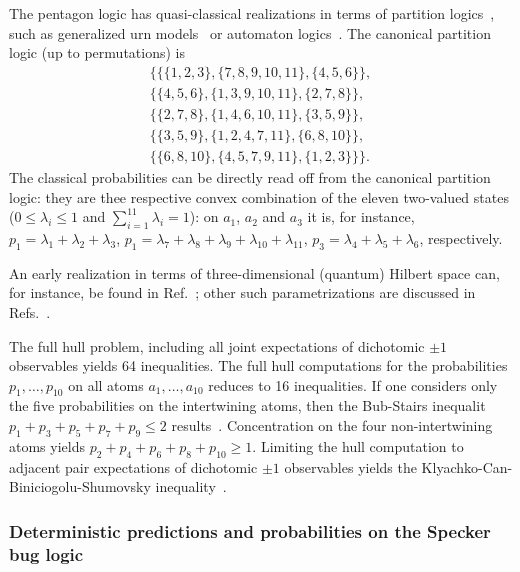 The pentagon logic has quasi-classical realizations in terms of partition logics~\cite{dvur-pul-svo,svozil-2001-eua,svozil-2008-ql},
such as generalized urn models~\cite{wright:pent,wright} or automaton logics~\cite{schaller-92,svozil-93,schaller-95,schaller-96}.
The canonical partition logic (up to permutations)  is
\begin{equation}
\begin{split}
\{
\{
\{1,2,3\},\{7,8,9,10,11\},\{4,5,6\}
\}
,\\
\{
\{4,5,6\},\{1,3,9,10,11\},\{2,7,8\}
\}
,\\
\{
\{2,7,8\},\{1,4,6,10,11\},\{3,5,9\}
\}
,\\
\{
\{3,5,9\},\{1,2,4,7,11\},\{6,8,10\}
\}
,\\
\{
\{6,8,10\},\{4,5,7,9,11\},\{1,2,3\}
\}
\}.
\end{split}
\end{equation}
The classical probabilities can be directly read off from the canonical partition logic: they are thee respective convex combination
of the eleven two-valued states ($0 \le \lambda_i \le 1$ and $\sum_{i=1}^{11}\lambda_i=1$): on $a_1$, $a_2$ and $a_3$ it is, for instance,
$p_1=\lambda_1+\lambda_2+\lambda_3$,
$p_1=\lambda_7+\lambda_8+\lambda_9+\lambda_{10}+\lambda_{11}$,
$p_3= \lambda_4+\lambda_5+\lambda_6$,
respectively.

An early realization in terms of three-dimensional (quantum) Hilbert space can, for instance, be found in Ref.~\cite[pp.~5392,5393]{svozil-tkadlec};
other such parametrizations are discussed in Refs.~\cite{Klyachko-2008,Bub-2009,Bub-2010,Badziag-2011}.

The full hull problem, including all joint expectations of dichotomic $\pm 1$ observables yields 64 inequalities.
The full hull computations for the probabilities $p_1, \ldots , p_{10}$
on all atoms $a_1, \ldots , a_{10}$ reduces to 16 inequalities.
If one considers only the five probabilities on the intertwining atoms,
then the Bub-Stairs inequalit $p_1+p_3+p_5+p_7+p_9 \le 2$ results~\cite{Bub-2009,Bub-2010,Badziag-2011}.
Concentration on the four non-intertwining atoms yields $p_2+p_4+p_6+p_8+p_{10} \ge 1$.
Limiting the hull computation to adjacent pair expectations of dichotomic $\pm 1$ observables
yields the Klyachko-Can-Biniciogolu-Shumovsky inequality~\cite{Klyachko-2008}.


\subsubsection{Deterministic predictions and probabilities on the Specker bug logic}
\label{2017-b-s-tif}
\label{2017-b-speckerbug}

